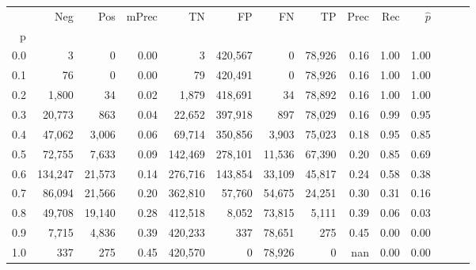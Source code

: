\begin{tabular}{rrrrrrrrrrrrrr}
\toprule
{} &      Neg &     Pos & mPrec &       TN &       FP &      FN &      TP &  Prec &   Rec & $\hat{p}$ \\
p   &          &         &       &          &          &         &         &       &       &           \\
\midrule
0.0 &        3 &       0 &  0.00 &        3 &  420,567 &       0 &  78,926 &  0.16 &  1.00 &      1.00 \\
0.1 &       76 &       0 &  0.00 &       79 &  420,491 &       0 &  78,926 &  0.16 &  1.00 &      1.00 \\
0.2 &    1,800 &      34 &  0.02 &    1,879 &  418,691 &      34 &  78,892 &  0.16 &  1.00 &      1.00 \\
0.3 &   20,773 &     863 &  0.04 &   22,652 &  397,918 &     897 &  78,029 &  0.16 &  0.99 &      0.95 \\
0.4 &   47,062 &   3,006 &  0.06 &   69,714 &  350,856 &   3,903 &  75,023 &  0.18 &  0.95 &      0.85 \\
0.5 &   72,755 &   7,633 &  0.09 &  142,469 &  278,101 &  11,536 &  67,390 &  0.20 &  0.85 &      0.69 \\
0.6 &  134,247 &  21,573 &  0.14 &  276,716 &  143,854 &  33,109 &  45,817 &  0.24 &  0.58 &      0.38 \\
0.7 &   86,094 &  21,566 &  0.20 &  362,810 &   57,760 &  54,675 &  24,251 &  0.30 &  0.31 &      0.16 \\
0.8 &   49,708 &  19,140 &  0.28 &  412,518 &    8,052 &  73,815 &   5,111 &  0.39 &  0.06 &      0.03 \\
0.9 &    7,715 &   4,836 &  0.39 &  420,233 &      337 &  78,651 &     275 &  0.45 &  0.00 &      0.00 \\
1.0 &      337 &     275 &  0.45 &  420,570 &        0 &  78,926 &       0 &   nan &  0.00 &      0.00 \\
\bottomrule
\end{tabular}
